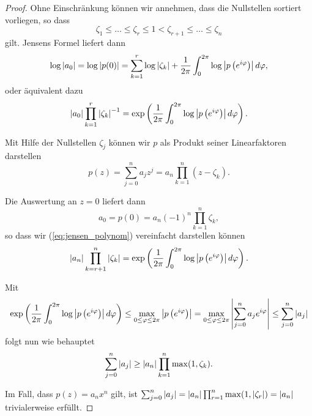 \begin{proof}
    Ohne Einschränkung können wir annehmen, dass die Nullstellen sortiert
    vorliegen, so dass
    \[
        \zeta_1 \leq \dots \leq \zeta_r \leq 1 < \zeta_{r+1} \leq \dots \leq \zeta_n
    \]
    gilt.
    Jensens Formel liefert dann
    \[
        \log \left\lvert a_0 \right\rvert
        = \log \left\lvert p(0) \right\rvert
        = \sum_{k=1}^{r} \log \left\lvert \zeta_k \right\rvert + \frac{1}{2\pi} \int_{0}^{2\pi} \log \left\lvert p\left( e^{i\varphi} \right) \right\rvert d\varphi,
    \]
    oder äquivalent dazu
    \begin{equation}
        \label{eq:jensen_polynom}
        \left\lvert a_0 \right\rvert \prod_{k=1}^{r} \left\lvert \zeta_k \right\rvert^{-1}
        = \exp\left( \frac{1}{2\pi} \int_{0}^{2\pi} \log \left\lvert p\left( e^{i\varphi} \right) \right\rvert d\varphi \right).
    \end{equation}

    \noindent Mit Hilfe der Nullstellen $\zeta_j$ können wir $p$ als Produkt
    seiner Linearfaktoren darstellen
    \[
        p(z) = \sum_{j = 0}^{n} a_j z^j = a_n \prod_{k=1}^n (z-\zeta_k).
    \]

    \noindent Die Auswertung an $z=0$ liefert dann
    \[
        a_0 = p(0) = a_n (-1)^n \prod_{k=1}^n \zeta_k,
    \]
    so dass wir (\ref{eq:jensen_polynom}) vereinfacht darstellen können
    \[
        \left\lvert a_n \right\rvert \prod_{k=r+1}^{n} \left\lvert \zeta_k \right\rvert
        = \exp\left( \frac{1}{2\pi} \int_{0}^{2\pi} \log \left\lvert p\left( e^{i\varphi} \right) \right\rvert d\varphi \right).
    \]

    \noindent Mit
    \begin{equation}
        \label{eq:jensen_integral_estimation}
        \exp\left( \frac{1}{2\pi} \int_{0}^{2\pi} \log \left\lvert p\left( e^{i\varphi} \right) \right\rvert d\varphi \right)
        \leq \max_{0 \leq \varphi \leq 2\pi} \left\lvert p\left( e^{i\varphi} \right)  \right\rvert
        = \max_{0 \leq \varphi \leq 2\pi} \left\lvert \sum_{j=0}^{n} a_j e^{i\varphi} \right\rvert
        \leq \sum_{j=0}^{n} \left\lvert a_j \right\rvert
    \end{equation}
    folgt nun wie behauptet
    \[
        \sum_{j=0}^n \left\lvert a_j \right\rvert \geq \left\lvert a_n \right\rvert \prod_{k=1}^n \max(1, \zeta_k).
    \]

    \noindent Im Fall, dass $p(z) = a_n x^n$ gilt, ist
    $ \sum_{j=0}^{n} \left\lvert a_j \right\rvert
      = \left\lvert a_n \right\rvert \prod_{r=1}^n \max(1, \left\lvert \zeta_r \right\rvert)
      = \left\lvert a_n \right\rvert $
    trivialerweise erfüllt.


\end{proof}
